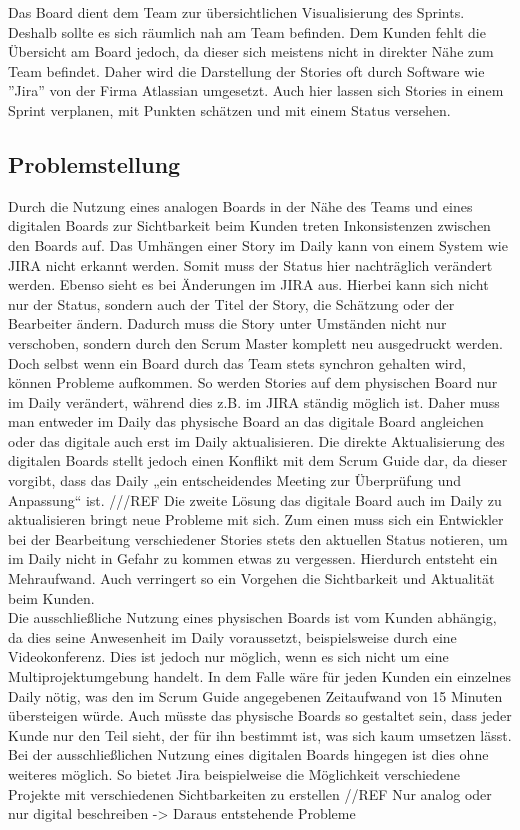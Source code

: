 \documentclass[12pt,titlepage]{scrartcl}
\begin{document}
		Das Board dient dem Team zur übersichtlichen Visualisierung des Sprints. Deshalb sollte es 				sich räumlich nah am Team befinden. Dem Kunden fehlt die Übersicht am Board jedoch, da dieser 		sich meistens nicht in direkter Nähe zum Team befindet. Daher wird die Darstellung der 					Stories oft durch Software wie ''Jira'' von der Firma Atlassian umgesetzt. Auch hier lassen 			sich Stories in einem Sprint verplanen, mit Punkten schätzen und mit einem Status versehen.
		
		\subsection{Problemstellung}
		Durch die Nutzung eines analogen Boards in der Nähe des Teams und eines digitalen Boards zur 			Sichtbarkeit beim Kunden treten Inkonsistenzen zwischen den Boards auf. Das Umhängen einer 				Story im Daily kann von einem System wie JIRA nicht erkannt werden. Somit muss der Status 				hier nachträglich verändert werden. Ebenso sieht es bei Änderungen im JIRA aus. Hierbei kann 			sich nicht nur der Status, sondern auch der Titel der Story, die Schätzung oder der 					Bearbeiter ändern. Dadurch muss die Story unter Umständen nicht nur verschoben, sondern durch 		den Scrum Master komplett neu ausgedruckt werden. \\
		Doch selbst wenn ein Board durch das Team stets synchron gehalten wird, können Probleme 				aufkommen. So werden Stories auf dem physischen Board nur im Daily verändert, während dies 				z.B. im JIRA ständig möglich ist. Daher muss man entweder im Daily das physische Board an das 		digitale Board angleichen oder das digitale auch erst im Daily aktualisieren. Die direkte 				Aktualisierung des digitalen Boards stellt jedoch einen Konflikt mit dem Scrum Guide dar, da 			dieser vorgibt, dass das Daily „ein entscheidendes Meeting zur Überprüfung und Anpassung“ 				ist. ///REF Die zweite Lösung das digitale Board auch im Daily zu aktualisieren bringt neue 			Probleme mit sich. Zum einen muss sich ein Entwickler bei der Bearbeitung verschiedener 				Stories stets den aktuellen Status notieren, um im Daily nicht in Gefahr zu kommen etwas zu 			vergessen. Hierdurch entsteht ein Mehraufwand. Auch verringert so ein Vorgehen die 						Sichtbarkeit und Aktualität beim Kunden. \\
		Die ausschließliche Nutzung eines physischen Boards ist vom Kunden abhängig, da dies seine 				Anwesenheit im Daily voraussetzt, beispielsweise durch eine Videokonferenz. Dies ist jedoch 			nur möglich, wenn es sich nicht um eine Multiprojektumgebung handelt. In dem Falle wäre für 			jeden Kunden ein einzelnes Daily nötig, was den im Scrum Guide angegebenen Zeitaufwand von 15 		Minuten übersteigen würde. Auch müsste das physische Boards so gestaltet sein, dass jeder 				Kunde nur den Teil sieht, der für ihn bestimmt ist, was sich kaum umsetzen lässt. \\
		Bei der ausschließlichen Nutzung eines digitalen Boards hingegen ist dies ohne weiteres 				möglich. So bietet Jira beispielweise die Möglichkeit verschiedene Projekte mit verschiedenen 		Sichtbarkeiten zu erstellen //REF
		Nur analog oder nur digital beschreiben -> Daraus entstehende Probleme
\end{document}
